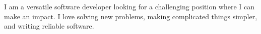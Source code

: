 
\begin{cvparagraph}
I am a versatile software developer looking for a challenging position where I
can make an impact. I love solving new problems, making complicated things
simpler, and writing reliable software.
\end{cvparagraph}
